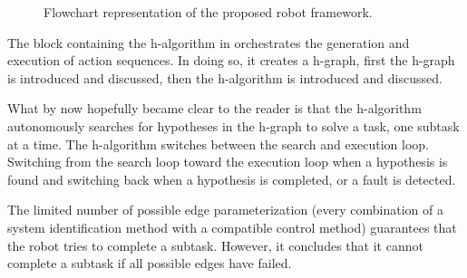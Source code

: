 \begin{figure}[H]
\caption{Flowchart representation of the proposed robot framework.}%
\label{tikz:flowchart_proposed_method}
\end{figure}

The block containing the \ac{h-algorithm} in  orchestrates the generation and execution of action sequences. In doing so, it creates a \ac{h-graph}, first the \ac{h-graph} is introduced and discussed, then the \ac{h-algorithm} is introduced and discussed.\bs





What by now hopefully became clear to the reader is that the \ac{h-algorithm} autonomously searches for hypotheses in the \ac{h-graph} to solve a task, one subtask at a time. The \ac{h-algorithm} switches between the search and execution loop. Switching from the search loop toward the execution loop when a hypothesis is found and switching back when a hypothesis is completed, or a fault is detected.\bs

The limited number of possible edge parameterization (every combination of a system identification method with a compatible control method) guarantees that the robot tries to complete a subtask. However, it concludes that it cannot complete a subtask if all possible edges have failed.\bs

